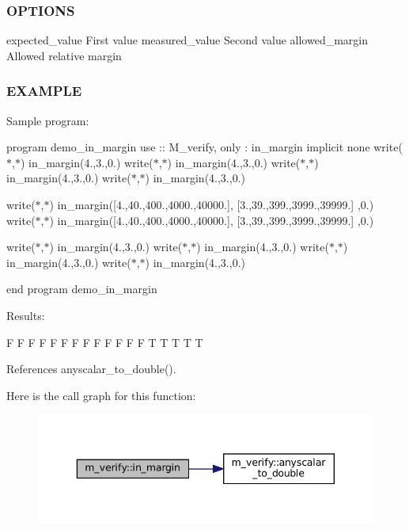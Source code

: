 \subsubsection*{O\+P\+T\+I\+O\+NS}

expected\+\_\+value First value measured\+\_\+value Second value allowed\+\_\+margin Allowed relative margin

\subsubsection*{E\+X\+A\+M\+P\+LE}

Sample program\+:

program demo\+\_\+in\+\_\+margin use \+:\+: M\+\_\+verify, only \+: in\+\_\+margin implicit none write($\ast$,$\ast$) in\+\_\+margin(4.,3.,0.) write($\ast$,$\ast$) in\+\_\+margin(4.,3.,0.) write($\ast$,$\ast$) in\+\_\+margin(4.,3.,0.) write($\ast$,$\ast$) in\+\_\+margin(4.,3.,0.)

write($\ast$,$\ast$) in\+\_\+margin(\mbox{[}4.,40.,400.,4000.,40000.\mbox{]}, \mbox{[}3.,39.,399.,3999.,39999.\mbox{]} ,0.) write($\ast$,$\ast$) in\+\_\+margin(\mbox{[}4.,40.,400.,4000.,40000.\mbox{]}, \mbox{[}3.,39.,399.,3999.,39999.\mbox{]} ,0.)

write($\ast$,$\ast$) in\+\_\+margin(4.,3.,0.) write($\ast$,$\ast$) in\+\_\+margin(4.,3.,0.) write($\ast$,$\ast$) in\+\_\+margin(4.,3.,0.) write($\ast$,$\ast$) in\+\_\+margin(4.,3.,0.)

end program demo\+\_\+in\+\_\+margin

Results\+:

F F F F F F F F F F F F F T T T T T 

References anyscalar\+\_\+to\+\_\+double().

Here is the call graph for this function\+:\nopagebreak
\begin{figure}[H]
\begin{center}
\leavevmode
\includegraphics[width=343pt]{namespacem__verify_aa0d8de1c26ca3aae0366b9fb8ead21c4_cgraph}
\end{center}
\end{figure}
\mbox{\label{namespacem__verify_a1a97667eb1d53ce5b97a60c4a9ebe565}} 
